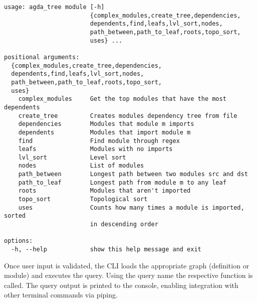 \noindent
\begin{minipage}{\textwidth}
\begin{lstlisting}[caption={Agda Tree Module Help Message},label={code:module help}]
usage: agda_tree module [-h]
                        {complex_modules,create_tree,dependencies,
                        dependents,find,leafs,lvl_sort,nodes,
                        path_between,path_to_leaf,roots,topo_sort,
                        uses} ...

positional arguments:
  {complex_modules,create_tree,dependencies,
  dependents,find,leafs,lvl_sort,nodes,
  path_between,path_to_leaf,roots,topo_sort,
  uses}
    complex_modules     Get the top modules that have the most dependents
    create_tree         Creates modules dependency tree from file
    dependencies        Modules that module m imports
    dependents          Modules that import module m
    find                Find module through regex
    leafs               Modules with no imports
    lvl_sort            Level sort
    nodes               List of modules
    path_between        Longest path between two modules src and dst
    path_to_leaf        Longest path from module m to any leaf
    roots               Modules that aren't imported
    topo_sort           Topological sort
    uses                Counts how many times a module is imported, sorted
                        in descending order

options:
  -h, --help            show this help message and exit
\end{lstlisting}
\end{minipage}

Once user input is validated, the CLI loads the appropriate graph (definition
or module) and executes the query. Using the query name the respective function
is called. The query output is printed to the console, enabling integration
with other terminal commands via piping.


